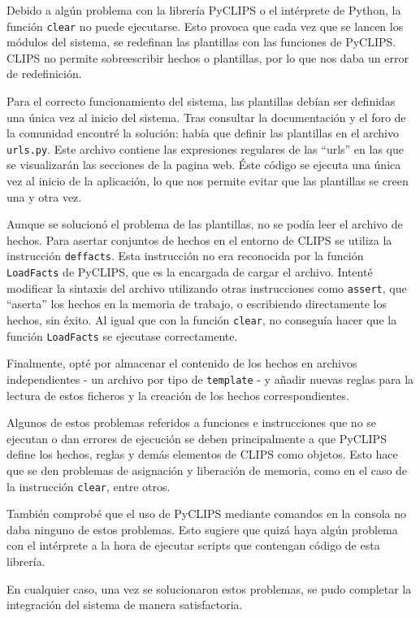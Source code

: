 Debido a algún problema con la librería PyCLIPS o el intérprete de Python, la función \texttt{clear} no puede ejecutarse. Esto provoca que cada vez que se lancen los módulos del sistema, se redefinan las plantillas con las funciones de PyCLIPS. CLIPS no permite sobreescribir hechos o plantillas, por lo que nos daba un error de redefinición. 

Para el correcto funcionamiento del sistema, las plantillas debían ser definidas una única vez al inicio del sistema. Tras consultar la documentación y el foro de la comunidad encontré la solución: había que definir las plantillas en el archivo \texttt{urls.py}. Este archivo contiene las expresiones regulares de las ``urls'' en las que se visualizarán las secciones de la pagina web. Éste código se ejecuta una única vez al inicio de la aplicación, lo que nos permite evitar que las plantillas se creen una y otra vez.

Aunque se solucionó el problema de las plantillas, no se podía leer el archivo de hechos. Para asertar conjuntos de hechos en el entorno de CLIPS se utiliza la instrucción \texttt{deffacts}. Esta instrucción no era reconocida por la función \texttt{LoadFacts} de PyCLIPS, que es la encargada de cargar el archivo. Intenté modificar la sintaxis del archivo utilizando otras instrucciones como \texttt{assert}, que ``aserta'' los hechos en la memoria de trabajo, o escribiendo directamente los hechos, sin éxito. Al igual que con la función \texttt{clear}, no conseguía hacer que la función \texttt{LoadFacts} se ejecutase correctamente. 

Finalmente, opté por almacenar el contenido de los hechos en archivos independientes - un archivo por tipo de \texttt{template} - y añadir nuevas reglas para la lectura de estos ficheros y la creación de los hechos correspondientes. 

\bigskip
Algunos de estos problemas referidos a funciones e instrucciones que no se ejecutan o dan errores de ejecución se deben principalmente a que PyCLIPS define los hechos, reglas y demás elementos de CLIPS como objetos. Esto hace que se den problemas de asignación y liberación de memoria, como en el caso de la instrucción \texttt{clear}, entre otros. 

También comprobé que el uso de PyCLIPS mediante comandos en la consola no daba ninguno de estos problemas. Esto sugiere que quizá haya algún problema con el intérprete a la hora de ejecutar scripts que contengan código de esta librería.

\bigskip
En cualquier caso, una vez se solucionaron estos problemas, se pudo completar la integración del sistema de manera satisfactoria.

